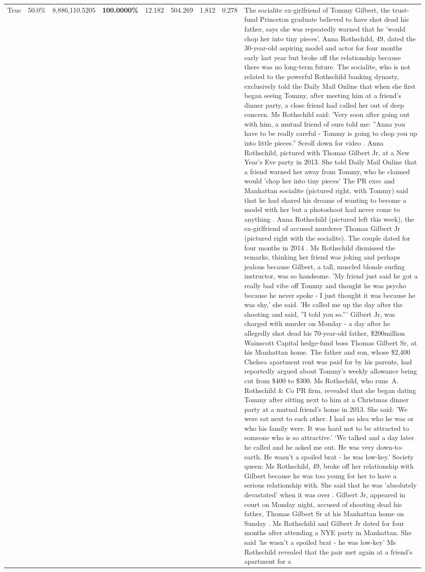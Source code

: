 \begin{table}[H]
\begin{tabular}{lllrlllll}
True & 50.0\% & 8,886,110.5205 & \bfseries \color{red} 100.0000\% & 12.182 & 504.269 & 1,812 & 0.278 & The socialite ex-girlfriend of Tommy Gilbert, the trust-fund Princeton graduate believed to have shot dead his father, says she was repeatedly warned that he 'would chop her into tiny pieces'. Anna Rothschild, 49, dated the 30-year-old aspiring model and actor for four months early last year but broke off the relationship because there was no long-term future. The socialite, who is not related to the powerful Rothschild banking dynasty, exclusively told the Daily Mail Online that when she first began seeing Tommy, after meeting him at a friend's dinner party, a close friend had called her out of deep concern. Ms Rothschild said: 'Very soon after going out with him, a mutual friend of ours told me: ''Anna you have to be really careful - Tommy is going to chop you up into little pieces.'' Scroll down for video . Anna Rothschild, pictured with Thomas Gilbert Jr, at a New Year's Eve party in 2013. She told Daily Mail Online that a friend warned her away from Tommy, who he claimed would 'chop her into tiny pieces' The PR exec and Manhattan socialite (pictured right, with Tommy) said that he had shared his dreams of wanting to become a model with her but a photoshoot had never come to anything . Anna Rothschild (pictured left this week), the ex-girlfriend of accused murderer Thomas Gilbert Jr (pictured right with the socialite). The couple dated for four months in 2014 . Ms Rothschild dismissed the remarks, thinking her friend was joking and perhaps jealous because Gilbert, a tall, muscled blonde surfing instructor, was so handsome. 'My friend just said he got a really bad vibe off Tommy and thought he was psycho because he never spoke - I just thought it was because he was shy,' she said. 'He called me up the day after the shooting and said, ''I told you so.''' Gilbert Jr, was charged with murder on Monday - a day after he allegedly shot dead his 70-year-old father, \$200million Wainscott Capital hedge-fund boss Thomas Gilbert Sr, at his Manhattan home. The father and son, whose \$2,400 Chelsea apartment rent was paid for by his parents, had reportedly argued about Tommy's weekly allowance being cut from \$400 to \$300. Ms Rothschild, who runs A. Rothschild \& Co PR firm, revealed that she began dating Tommy after sitting next to him at a Christmas dinner party at a mutual friend's home in 2013. She said: 'We were sat next to each other. I had no idea who he was or who his family were. It was hard not to be attracted to someone who is so attractive.' ‘We talked and a day later he called and he asked me out. He was very down-to-earth. He wasn’t a spoiled brat - he was low-key.’ Society queen: Ms Rothschild, 49, broke off her relationship with Gilbert because he was too young for her to have a serious relationship with. She said that he was 'absolutely devastated' when it was over . Gilbert Jr, appeared in court on Monday night, accused of shooting dead his father, Thomas Gilbert Sr at his Manhattan home on Sunday . Ms Rothschild and Gilbert Jr dated for four months after attending a NYE party in Manhattan. She said 'he wasn't a spoiled brat - he was low-key' Ms Rothschild revealed that the pair met again at a friend’s apartment for a 
\end{tabular}
\end{table}
